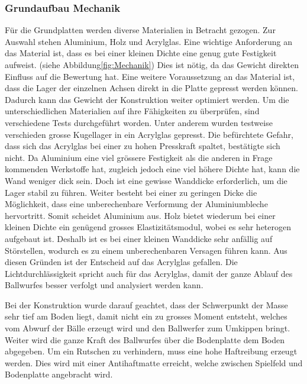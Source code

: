 \subsubsection{Grundaufbau Mechanik}
Für die Grundplatten werden diverse Materialien in Betracht gezogen. Zur Auswahl stehen Aluminium, Holz und Acrylglas. Eine wichtige Anforderung an das Material ist, dass es bei einer kleinen Dichte eine genug gute Festigkeit aufweist. (siehe Abbildung\ref{fig:Mechanik})
Dies ist nötig, da das Gewicht direkten Einfluss auf die Bewertung hat. Eine weitere Voraussetzung an das Material ist, dass die Lager der einzelnen Achsen direkt in die Platte gepresst werden können. Dadurch kann das Gewicht der Konstruktion weiter optimiert werden. Um die unterschiedlichen Materialien auf ihre Fähigkeiten zu überprüfen, sind verschiedene Tests durchgeführt worden. Unter anderem wurden testweise verschieden grosse Kugellager in ein Acrylglas gepresst. Die befürchtete Gefahr, dass sich das Acrylglas bei einer zu hohen Presskraft spaltet, bestätigte sich nicht. Da Aluminium eine viel grössere Festigkeit als die anderen in Frage kommenden Werkstoffe hat, zugleich jedoch eine viel höhere Dichte hat, kann die Wand weniger dick sein. Doch ist eine gewisse Wanddicke erforderlich, um die Lager stabil zu führen. Weiter besteht bei einer zu geringen Dicke die Möglichkeit, dass eine unberechenbare Verformung der Aluminiumbleche hervortritt. Somit scheidet Aluminium aus. Holz bietet wiederum bei einer kleinen Dichte ein genügend grosses Elastizitätsmodul, wobei es sehr heterogen aufgebaut ist. Deshalb ist es bei einer kleinen Wanddicke sehr anfällig auf Störstellen, wodurch es zu einem unberechenbaren Versagen führen kann. Aus diesen Gründen ist der Entscheid auf das Acrylglas gefallen. Die Lichtdurchlässigkeit spricht auch für das Acrylglas, damit der ganze Ablauf des Ballwurfes besser verfolgt und analysiert werden kann. 

Bei der Konstruktion wurde darauf geachtet, dass der Schwerpunkt der Masse sehr tief am Boden liegt, damit nicht ein zu grosses Moment entsteht, welches vom Abwurf der Bälle erzeugt wird und den Ballwerfer zum Umkippen bringt. Weiter wird die ganze Kraft des Ballwurfes über die Bodenplatte dem Boden abgegeben. Um ein Rutschen zu verhindern, muss eine hohe Haftreibung erzeugt werden. Dies wird mit einer Antihaftmatte erreicht, welche zwischen Spielfeld und Bodenplatte angebracht wird.

